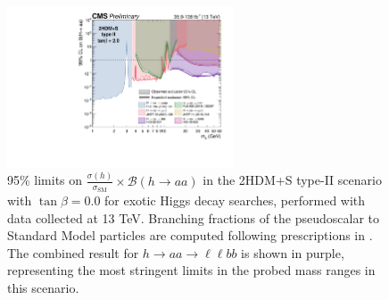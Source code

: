   \begin{figure}[ht]
    \begin{center}
      \includegraphics[width=0.6\textwidth]{figures/ch-13-results/summary_plot_full_run2_plot_BRaa_Type2_tanbeta2.pdf}
    \end{center}
    \caption[95\% limits on $\frac{\sigma(h)}{\sigma_{\text{SM}}} \times \mathcal{B}(h \rightarrow aa)$ in the 2HDM+S type-II scenario with $\tan\beta = 2.0$ for exotic Higgs decay searches, performed with data collected at 13 TeV.]{95\% limits on $\frac{\sigma(h)}{\sigma_{\text{SM}}} \times \mathcal{B}(h \rightarrow aa)$ in the 2HDM+S type-II scenario with $\tan\beta = 0.0$ for exotic Higgs decay searches, performed with data collected at 13 TeV. Branching fractions of the pseudoscalar to Standard Model particles are computed following prescriptions in \cite{curtin_exotic_2014}. The combined result for $h\rightarrow aa \rightarrow \ell\ell bb$ \cite{CMS-HIG-22-007} is shown in purple, representing the most stringent limits in the probed mass ranges in this scenario.}
      \label{fig:summary_plot_typeII_tan_beta_2p0}
  \end{figure}
